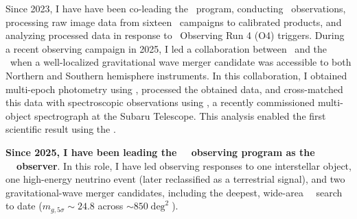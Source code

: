 Since 2023, I have have been co-leading the \DESGW\ program, conducting \DECam\ observations, processing raw image data from sixteen \ToO\ campaigns to calibrated products, and analyzing processed data in response to \LVK\ Observing Run 4 (O4) triggers.
During a recent observing campaign in 2025, I led a collaboration between \DESGW\ and the \JGEM\ when a well-localized gravitational wave merger candidate was accessible to both Northern and Southern hemisphere instruments. In this collaboration, I obtained multi-epoch photometry using \DECam, processed the obtained data, and cross-matched this data with spectroscopic observations using \PFS, a recently commissioned multi-object spectrograph at the Subaru Telescope. This analysis enabled the first scientific result using the \PFS.

\textbf{Since 2025, I have been leading the \Rubin\ \ToO\ observing program as the \Rubin\ \ToO\ observer}. In this role, I have led observing responses to one interstellar object, one high-energy neutrino event (later reclassified as a terrestrial signal), and two gravitational-wave merger candidates, including the deepest, wide-area \GW\ \ToO\ search to date ($m_{g,5\sigma}\sim24.8$ across $\sim850\deg^2$). %



